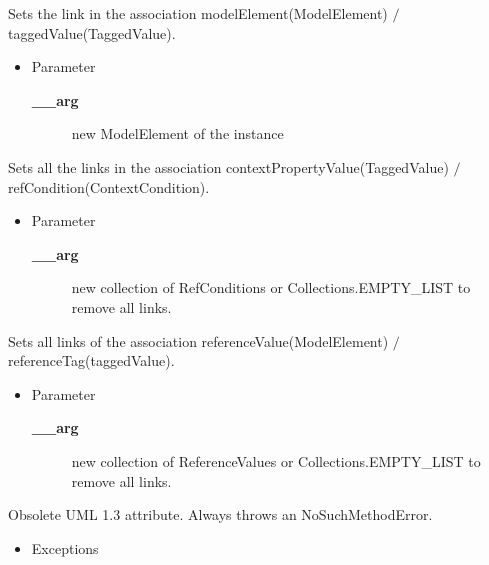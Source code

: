 \begin{desc}Sets the link in the association modelElement(ModelElement)
 $/$ taggedValue(TaggedValue).
\begin{itemize}
\item{Parameter
  \begin{description}
   \item[{\bf \_\_arg}]{new ModelElement of the instance}
  \end{description}}
\end{itemize}
\end{desc}

\begin{desc}Sets all the links in the association contextPropertyValue(TaggedValue)
 $/$ refCondition(ContextCondition).
\begin{itemize}
\item{Parameter
  \begin{description}
   \item[{\bf \_\_arg}]{new collection of RefConditions or Collections.EMPTY\_LIST to
        remove all links.}
  \end{description}}
\end{itemize}
\end{desc}

\begin{desc}Sets all links of the association referenceValue(ModelElement)
 $/$ referenceTag(taggedValue).
\begin{itemize}
\item{Parameter
  \begin{description}
   \item[{\bf \_\_arg}]{new collection of ReferenceValues or Collections.EMPTY\_LIST to
        remove all links.}
  \end{description}}
\end{itemize}
\end{desc}

\begin{desc}Obsolete UML 1.3 attribute. Always throws an NoSuchMethodError.
\begin{itemize}
\item{{Exceptions}
}
\end{itemize}
\end{desc}


